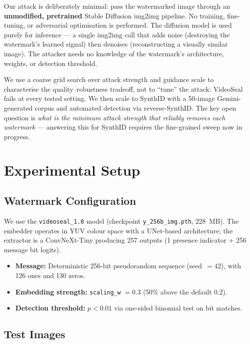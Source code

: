 \documentclass[11pt,a4paper]{article}
\begin{document}
Our attack is deliberately minimal: pass the watermarked image through an
\textbf{unmodified, pretrained} Stable Diffusion img2img pipeline. No
training, fine-tuning, or adversarial optimisation is performed. The
diffusion model is used purely for inference --- a single img2img call
that adds noise (destroying the watermark's learned signal) then denoises
(reconstructing a visually similar image). The attacker needs no knowledge
of the watermark's architecture, weights, or detection threshold.

We use a coarse grid search over attack strength and guidance scale to
characterise the quality--robustness tradeoff, not to ``tune'' the attack:
VideoSeal fails at every tested setting. We then scale to SynthID with a
50-image Gemini-generated corpus and automated detection via
reverse-SynthID. The key open question is \emph{what is the minimum attack
strength that reliably removes each watermark} --- answering this for
SynthID requires the fine-grained sweep now in progress.

\section{Experimental Setup}
\label{sec:setup}

\subsection{Watermark Configuration}

We use the \texttt{videoseal\_1.0} model (checkpoint
\texttt{y\_256b\_img.pth}, 228~MB). The embedder operates in YUV colour
space with a UNet-based architecture; the extractor is a ConvNeXt-Tiny
producing 257 outputs (1 presence indicator + 256 message bit logits).

\begin{itemize}
    \item \textbf{Message:} Deterministic 256-bit pseudorandom sequence
    (seed~$= 42$), with 126 ones and 130 zeros.
    \item \textbf{Embedding strength:} \texttt{scaling\_w} $= 0.3$
    (50\% above the default 0.2).
    \item \textbf{Detection threshold:} $p < 0.01$ via one-sided binomial
    test on bit matches.
\end{itemize}

\subsection{Test Images}
\end{document}
